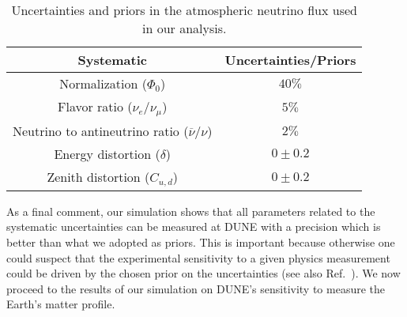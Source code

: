 \begin{table}
\begin{center}
\caption{Uncertainties and priors in the atmospheric neutrino flux used in our analysis. \label{tab:Fluxuncert}}\vspace{0.1cm}
\begin{tabular}{|c|c|}\hline
Systematic  &Uncertainties/Priors \\ \hline\hline
Normalization ($\Phi_{0}$) & $40\%$ \\ \hline
Flavor ratio ($\nu_{e}/\nu_{\mu}$) & $5\%$ \\ \hline
Neutrino to antineutrino ratio ($\overline{\nu}/\nu$)  & $2\%$ \\ \hline
Energy distortion ($\delta$)   &$0\pm0.2$ \\ \hline
Zenith distortion ($C_{u,d}$)   &$0\pm0.2$ \\ \hline
\end{tabular}
\end{center}
\end{table}




As a final comment, our simulation shows that all parameters related to the systematic uncertainties can be measured at DUNE with a precision which is better than what we adopted as priors. 
This is important because otherwise one could suspect that the experimental sensitivity to a given physics measurement could be  driven by the chosen prior on the uncertainties (see also Ref.~\cite{Kelly:2019itm}).
We now proceed to the results of our simulation on DUNE's sensitivity to measure the Earth's matter profile.






